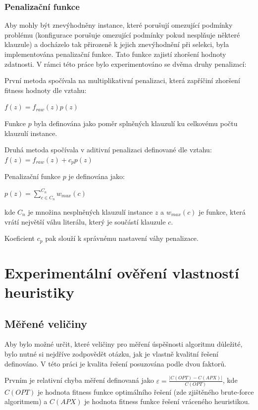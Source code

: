\documentclass[12pt,oneside,a4paper]{article}
\begin{document}
\subsubsection{Penalizační funkce}

Aby mohly být znevýhodněny instance, které porušují omezující podmínky problému (konfigurace porušuje omezující podmínky pokud nesplňuje některé klauzule) a docházelo tak přirozeně k jejich znevýhodnění při selekci, byla implementována penalizační funkce. Tato funkce zajistí zhoršení hodnoty zdatnosti. V rámci této práce bylo experimentováno se dvěma druhy penalizací:

První metoda spočívala na multiplikativní penalizaci, která zapříčiní zhoršení fitness hodnoty dle vztahu:

$f(z) = f_{raw}(z)p(z)$

Funkce $p$ byla definována jako poměr splněných klauzulí ku celkovému počtu klauzulí instance.

Druhá metoda spočívala v aditivní penalizaci definované dle vztahu:
$f(z) = f_{raw}(z) + c_pp(z)$

Penalizační funkce $p$ je definována jako:

$p(z) = \sum\limits_{c \in C_n}^{C_{n}} w_{max}(c)$

kde $C_n$ je množina nesplněných klauzulí instance $z$ a $w_{max}(c)$ je funkce, která vrátí největší váhu literálu, který je součástí klauzule $c$.

Koeficient $c_p$ pak slouží k správnému nastavení váhy penalizace.


\section{Experimentální ověření vlastností heuristiky}

\subsection{Měřené veličiny}

Aby bylo možné určit, které veličiny pro měření úspěšnosti algoritmu důležité, bylo nutné si nejdříve zodpovědět otázku, jak je vlastně kvalitní řešení definováno. V této práci je kvalita řešení posuzována podle dvou faktorů. 

Prvním je relativní chyba měření definovaná jako $\varepsilon = \frac{|C(OPT)-C(APX)|}{C(OPT)}$, kde $C(OPT)$ je hodnota fitness funkce optimálního řešení (zde zjištěného brute-force algoritmem) a $C(APX)$ je hodnota fitness funkce řešení vráceného heuristikou.
\end{document}
